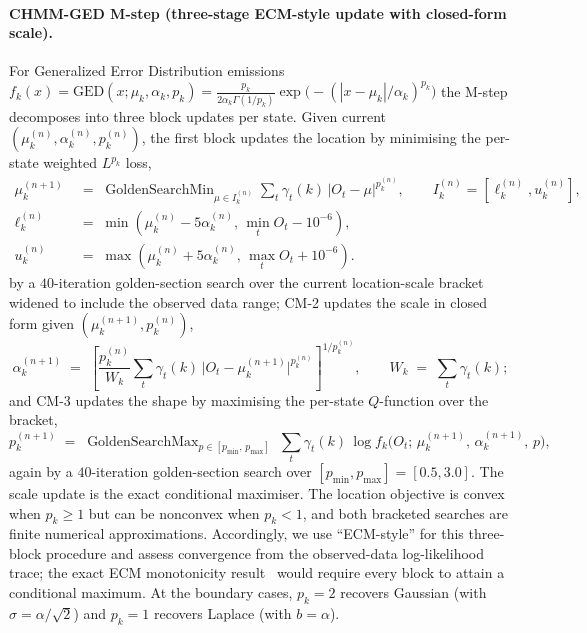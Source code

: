 \paragraph{CHMM-GED M-step (three-stage ECM-style update with closed-form scale).}
For Generalized Error Distribution emissions $f_k(x) = \mathrm{GED}(x; \mu_k, \alpha_k, p_k) = \frac{p_k}{2 \alpha_k \Gamma(1/p_k)} \exp\!\big(-(|x - \mu_k|/\alpha_k)^{p_k}\big)$ the M-step decomposes into three block updates per state. Given current $(\mu_k^{(n)}, \alpha_k^{(n)}, p_k^{(n)})$, the first block updates the location by minimising the per-state weighted $L^{p_k}$ loss,
\begin{equation}
    \begin{aligned}
    \mu_k^{(n+1)} &\;=\; \operatorname{GoldenSearchMin}_{\mu \in I_k^{(n)}}
        \sum_t \gamma_t(k)\, \big|O_t - \mu\big|^{p_k^{(n)}},
        \qquad I_k^{(n)} = [\ell_k^{(n)}, u_k^{(n)}],\\[-2pt]
    \ell_k^{(n)} &\;=\; \min\!\left(\mu_k^{(n)} - 5\alpha_k^{(n)},\, \min_t O_t - 10^{-6}\right),\\[-2pt]
    u_k^{(n)} &\;=\; \max\!\left(\mu_k^{(n)} + 5\alpha_k^{(n)},\, \max_t O_t + 10^{-6}\right).
    \end{aligned}
    \label{eq:ged_mu}
\end{equation}
by a $40$-iteration golden-section search over the current location-scale bracket widened to include the observed data range; CM-2 updates the scale in closed form given $(\mu_k^{(n+1)}, p_k^{(n)})$,
\begin{equation}
    \alpha_k^{(n+1)} \;=\; \left[\frac{p_k^{(n)}}{W_k} \sum_t \gamma_t(k)\, \big|O_t - \mu_k^{(n+1)}\big|^{p_k^{(n)}}\right]^{1 / p_k^{(n)}}, \qquad W_k \;=\; \sum_t \gamma_t(k);
    \label{eq:ged_alpha}
\end{equation}
and CM-3 updates the shape by maximising the per-state $Q$-function over the bracket,
\begin{equation}
    p_k^{(n+1)} \;=\; \operatorname{GoldenSearchMax}_{p \in [p_{\min},\, p_{\max}]} \;\sum_t \gamma_t(k)\, \log f_k\!\big(O_t;\, \mu_k^{(n+1)},\, \alpha_k^{(n+1)},\, p\big),
    \label{eq:ged_p}
\end{equation}
again by a $40$-iteration golden-section search over $[p_{\min}, p_{\max}] = [0.5, 3.0]$. The scale update is the exact conditional maximiser. The location objective is convex when $p_k \ge 1$ but can be nonconvex when $p_k < 1$, and both bracketed searches are finite numerical approximations. Accordingly, we use ``ECM-style'' for this three-block procedure and assess convergence from the observed-data log-likelihood trace; the exact ECM monotonicity result~\citep{mengrubin1993ecm} would require every block to attain a conditional maximum. At the boundary cases, $p_k = 2$ recovers Gaussian (with $\sigma = \alpha/\sqrt{2}$) and $p_k = 1$ recovers Laplace (with $b = \alpha$).

